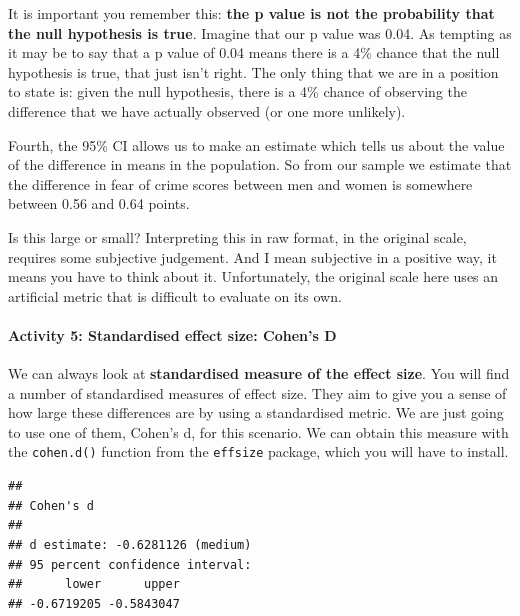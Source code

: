 \documentclass[
]{book}
\newenvironment{Shaded}{\begin{snugshade}}{\end{snugshade}}
\newcommand{\FunctionTok}[1]{\textcolor[rgb]{0.00,0.00,0.00}{#1}}
\newcommand{\NormalTok}[1]{#1}
\newcommand{\SpecialCharTok}[1]{\textcolor[rgb]{0.00,0.00,0.00}{#1}}
\begin{document}
It is important you remember this: \textbf{the p value is not the probability that the null hypothesis is true}. Imagine that our p value was 0.04. As tempting as it may be to say that a p value of 0.04 means there is a 4\% chance that the null hypothesis is true, that just isn't right. The only thing that we are in a position to state is: given the null hypothesis, there is a 4\% chance of observing the difference that we have actually observed (or one more unlikely).

Fourth, the 95\% CI allows us to make an estimate which tells us about the value of the difference in means in the population. So from our sample we estimate that the difference in fear of crime scores between men and women is somewhere between 0.56 and 0.64 points.

Is this large or small? Interpreting this in raw format, in the original scale, requires some subjective judgement. And I mean subjective in a positive way, it means you have to think about it. Unfortunately, the original scale here uses an artificial metric that is difficult to evaluate on its own.

\hypertarget{activity-5-standardised-effect-size-cohens-d}{%
\paragraph{Activity 5: Standardised effect size: Cohen's D}\label{activity-5-standardised-effect-size-cohens-d}}

We can always look at \textbf{standardised measure of the effect size}. You will find a number of standardised measures of effect size. They aim to give you a sense of how large these differences are by using a standardised metric. We are just going to use one of them, Cohen's d, for this scenario. We can obtain this measure with the \texttt{cohen.d()} function from the \texttt{effsize} package, which you will have to install.

\begin{Shaded}
\end{Shaded}

\begin{verbatim}
## 
## Cohen's d
## 
## d estimate: -0.6281126 (medium)
## 95 percent confidence interval:
##      lower      upper 
## -0.6719205 -0.5843047
\end{verbatim}
\end{document}
